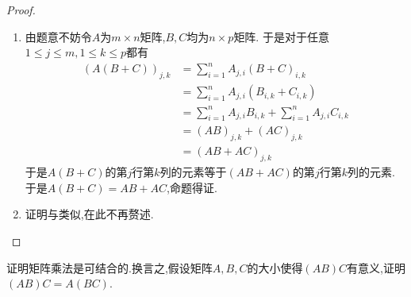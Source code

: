 \documentclass{ctexart}
\begin{document}
\begin{proof}
    \begin{enumerate}[label=\tbf{(\arabic*)}]
        \item 由题意不妨令$A$为$m\times n$矩阵,$B,C$均为$n\times p$矩阵.%
            于是对于任意$1\leqslant j\leqslant m,1\leqslant k\leqslant p$都有
            $$\begin{aligned}
                \left(A(B+C)\right)_{j,k}
                &= \sum_{i=1}^{n}A_{j,i}(B+C)_{i,k}\\
                &= \sum_{i=1}^{n}A_{j,i}\left(B_{i,k}+C_{i,k}\right)\\
                &= \sum_{i=1}^{n}A_{j,i}B_{i,k}+\sum_{i=1}^{n}A_{j,i}C_{i,k}\\
                &= (AB)_{j,k}+(AC)_{j,k}\\
                &= (AB+AC)_{j,k}
            \end{aligned}$$
            于是$A(B+C)$的第$j$行第$k$列的元素等于$(AB+AC)$的第$j$行第$k$列的元素.\\
            于是$A(B+C)=AB+AC$,命题得证.
        \item 证明与类似,在此不再赘述.
    \end{enumerate}
\end{proof}
\begin{problem}[12.]
    证明矩阵乘法是可结合的.换言之,假设矩阵$A,B,C$的大小使得$(AB)C$有意义,证明$(AB)C=A(BC)$.
\end{problem}
\end{document}
